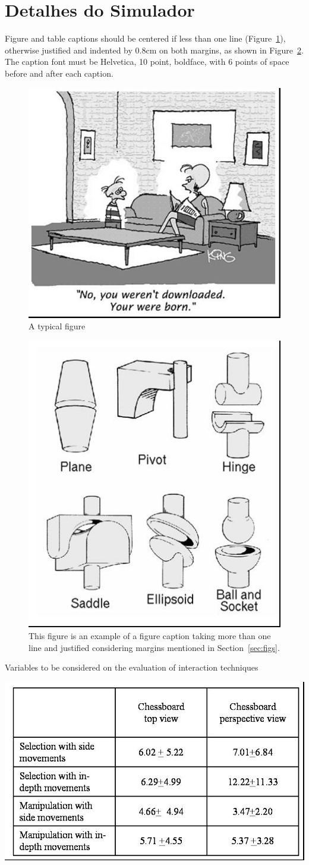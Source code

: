 \documentclass[12pt]{article}
\begin{document}
\section{Detalhes do Simulador}


Figure and table captions should be centered if less than one line
(Figure~\ref{fig:exampleFig1}), otherwise justified and indented by 0.8cm on
both margins, as shown in Figure~\ref{fig:exampleFig2}. The caption font must
be Helvetica, 10 point, boldface, with 6 points of space before and after each
caption.

\begin{figure}[ht]
\centering
\includegraphics[width=.5\textwidth]{fig1.jpg}
\caption{A typical figure}
\label{fig:exampleFig1}
\end{figure}


\begin{figure}[ht]
\centering
\includegraphics[width=.3\textwidth]{fig2.jpg}
\caption{This figure is an example of a figure caption taking more than one
  line and justified considering margins mentioned in Section~\ref{sec:figs}.}
\label{fig:exampleFig2}
\end{figure}


\begin{table}[ht]
\centering
\caption{Variables to be considered on the evaluation of interaction
  techniques}
\label{tab:exTable1}
\includegraphics[width=.7\textwidth]{table.jpg}
\end{table}
\end{document}
